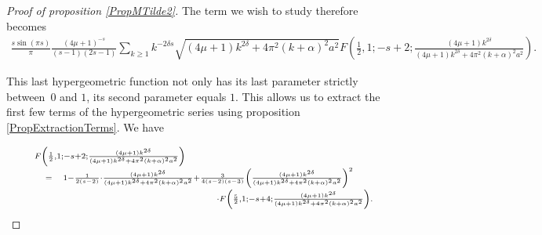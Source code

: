 \documentclass{jams-l}
\theoremstyle{definition}
\theoremstyle{remark}
\numberwithin{equation}{section}
\begin{document}
\begin{proof}[Proof of proposition \ref{PropMTilde2}]
                        \noindent The term we wish to study therefore becomes
                        \[ \begin{array}{c}
                                \scriptstyle \frac{s \sin \left( \pi s \right)}{\pi} \frac{\left( 4 \mu + 1 \right)^{-s}}{\left( s-1 \right) \left( 2s-1 \right)} \sum\limits_{k \geqslant 1} k^{-2 \delta s} \sqrt{\left( 4 \mu + 1 \right) k^{2 \delta} + 4 \pi^2 \left( k + \alpha \right)^2 a^2} F \left( \frac{1}{2}, 1; -s+2; \frac{\left( 4 \mu + 1 \right) k^{2 \delta}}{\left( 4 \mu + 1 \right) k^{2 \delta} + 4 \pi^2 \left( k + \alpha \right)^2 a^2} \right).
                            \end{array} \]
                        
                        \noindent This last hypergeometric function not only has its last parameter strictly between~$0$ and $1$, its second parameter equals $1$. This allows us to extract the first few terms of the hypergeometric series using proposition \ref{PropExtractionTerms}. We have
                        
                        \begin{equation}
                        \label{EqMTildePart2HypergeometricBreaking}
                            \begin{array}{lll}
                                \multicolumn{3}{l}{\scriptstyle F \left( \frac{1}{2}, 1; -s+2; \frac{\left( 4 \mu + 1 \right) k^{2 \delta}}{\left( 4 \mu + 1 \right) k^{2 \delta} + 4 \pi^2 \left( k + \alpha \right)^2 a^2} \right)} \\[0.5em]
                                
                                & \scriptstyle = & \scriptstyle 1 - \frac{1}{2 \left( s-2 \right)} \cdot \frac{\left( 4 \mu + 1 \right) k^{2 \delta}}{\left( 4 \mu + 1 \right) k^{2 \delta} + 4 \pi^2 \left( k + \alpha \right)^2 a^2} + \frac{3}{4 \left( s-2 \right) \left( s-3 \right)} \left( \frac{\left( 4 \mu + 1 \right) k^{2 \delta}}{\left( 4 \mu + 1 \right) k^{2 \delta} + 4 \pi^2 \left( k + \alpha \right)^2 a^2} \right)^2 \\[0.5em]
                                
                                && \scriptstyle \qquad \qquad \qquad \qquad \qquad \qquad \qquad \cdot F \left( \frac{5}{2}, 1; -s+4; \frac{\left( 4 \mu + 1 \right) k^{2 \delta}}{\left( 4 \mu + 1 \right) k^{2 \delta} + 4 \pi^2 \left( k + \alpha \right)^2 a^2} \right). 
                            \end{array}
                        \end{equation}
                        

\end{proof}
\end{document}
